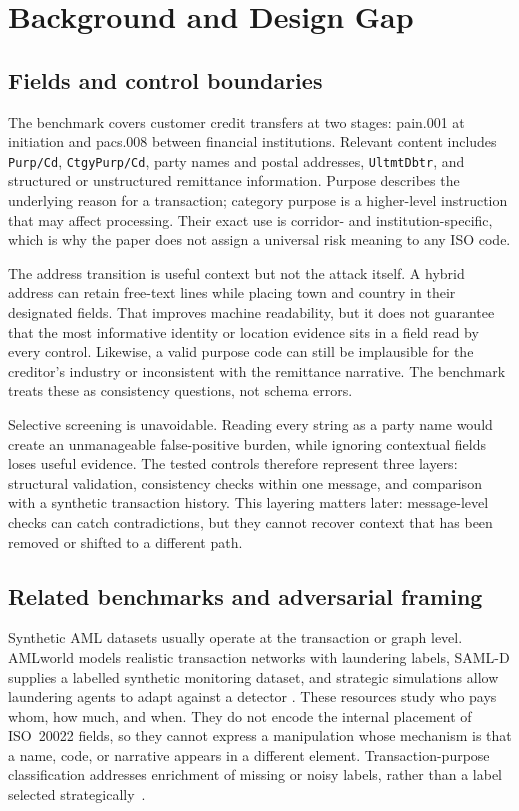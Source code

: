 \documentclass[conference]{IEEEtran}
\begin{document}
\section{Background and Design Gap}
\subsection{Fields and control boundaries}
The benchmark covers customer credit transfers at two stages: pain.001 at
initiation and pacs.008 between financial institutions. Relevant content
includes \texttt{Purp/Cd}, \texttt{CtgyPurp/Cd}, party names and postal
addresses, \texttt{UltmtDbtr}, and structured or unstructured remittance
information. Purpose describes the underlying reason for a transaction;
category purpose is a higher-level instruction that may affect processing.
Their exact use is corridor- and institution-specific, which is why the paper
does not assign a universal risk meaning to any ISO code.

The address transition is useful context but not the attack itself. A hybrid
address can retain free-text lines while placing town and country in their
designated fields. That improves machine readability, but it does not guarantee
that the most informative identity or location evidence sits in a field read
by every control. Likewise, a valid purpose code can still be implausible for
the creditor's industry or inconsistent with the remittance narrative. The
benchmark treats these as consistency questions, not schema errors.

Selective screening is unavoidable. Reading every string as a party name
would create an unmanageable false-positive burden, while ignoring contextual
fields loses useful evidence. The tested controls therefore represent three
layers: structural validation, consistency checks within one message, and
comparison with a synthetic transaction history. This layering matters later:
message-level checks can catch contradictions, but they cannot recover context
that has been removed or shifted to a different path.

\subsection{Related benchmarks and adversarial framing}
Synthetic AML datasets usually operate at the transaction or graph level.
AMLworld models realistic transaction networks with laundering labels,
SAML-D supplies a labelled synthetic monitoring dataset, and strategic
simulations allow laundering agents to adapt against a detector
\cite{altman2023,oztas2023,wang2025}. These resources study who pays whom, how
much, and when. They do not encode the internal placement of ISO~20022 fields,
so they cannot express a manipulation whose mechanism is that a name, code, or
narrative appears in a different element. Transaction-purpose classification
addresses enrichment of missing or noisy labels, rather than a label selected
strategically~\cite{busson2023}.
\end{document}
